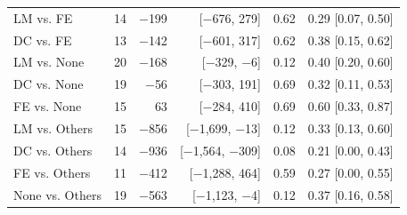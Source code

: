 \begin{table}[!htbp]
\begin{tabular}{@{}lrrrrl@{}}
LM vs. FE & 14 & $-$199 & [$-$676, 279] & 0.62 & 0.29 [0.07, 0.50] \\
DC vs. FE & 13 & $-$142 & [$-$601, 317] & 0.62 & 0.38 [0.15, 0.62] \\
LM vs. None & 20 & $-$168 & [$-$329, $-$6] & 0.12 & 0.40 [0.20, 0.60] \\
DC vs. None & 19 & $-$56 & [$-$303, 191] & 0.69 & 0.32 [0.11, 0.53] \\
FE vs. None & 15 & 63 & [$-$284, 410] & 0.69 & 0.60 [0.33, 0.87] \\
LM vs. Others & 15 & $-$856 & [$-$1,699, $-$13] & 0.12 & 0.33 [0.13, 0.60] \\
DC vs. Others & 14 & $-$936 & [$-$1,564, $-$309] & 0.08 & 0.21 [0.00, 0.43] \\
FE vs. Others & 11 & $-$412 & [$-$1,288, 464] & 0.59 & 0.27 [0.00, 0.55] \\
None vs. Others & 19 & $-$563 & [$-$1,123, $-$4] & 0.12 & 0.37 [0.16, 0.58] \\
\bottomrule
\end{tabular}
\end{table}
